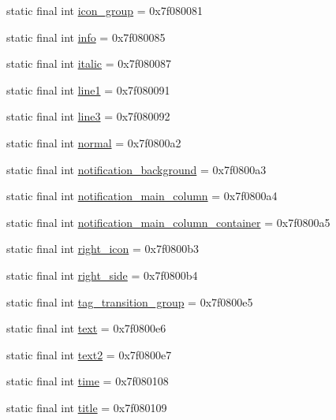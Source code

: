 \begin{DoxyCompactItemize}
\item 
static final int \mbox{\hyperlink{classandroid_1_1support_1_1coreutils_1_1_r_1_1id_a07a2377dc709f9b50bc8a09318b64122}{icon\+\_\+group}} = 0x7f080081
\item 
static final int \mbox{\hyperlink{classandroid_1_1support_1_1coreutils_1_1_r_1_1id_ae996f4622d90132cfe7f3be798020e06}{info}} = 0x7f080085
\item 
static final int \mbox{\hyperlink{classandroid_1_1support_1_1coreutils_1_1_r_1_1id_a539af34a99b5672098858499696f6cb9}{italic}} = 0x7f080087
\item 
static final int \mbox{\hyperlink{classandroid_1_1support_1_1coreutils_1_1_r_1_1id_a0cff5627ffcbf5f76f88226a5fbef890}{line1}} = 0x7f080091
\item 
static final int \mbox{\hyperlink{classandroid_1_1support_1_1coreutils_1_1_r_1_1id_acd696443c38c57bc37e035129bcb26f2}{line3}} = 0x7f080092
\item 
static final int \mbox{\hyperlink{classandroid_1_1support_1_1coreutils_1_1_r_1_1id_ab1d4420202145fcc0e69eceb35444d40}{normal}} = 0x7f0800a2
\item 
static final int \mbox{\hyperlink{classandroid_1_1support_1_1coreutils_1_1_r_1_1id_a3bce5f3ad761b323a2eb99f303396649}{notification\+\_\+background}} = 0x7f0800a3
\item 
static final int \mbox{\hyperlink{classandroid_1_1support_1_1coreutils_1_1_r_1_1id_a4db238dc74de8db9a5f8c2ee83771e07}{notification\+\_\+main\+\_\+column}} = 0x7f0800a4
\item 
static final int \mbox{\hyperlink{classandroid_1_1support_1_1coreutils_1_1_r_1_1id_aa8cbb39f18ff6181e76ad965e4a63d9f}{notification\+\_\+main\+\_\+column\+\_\+container}} = 0x7f0800a5
\item 
static final int \mbox{\hyperlink{classandroid_1_1support_1_1coreutils_1_1_r_1_1id_a43edd588873f2c79d6ee8ef316cd53db}{right\+\_\+icon}} = 0x7f0800b3
\item 
static final int \mbox{\hyperlink{classandroid_1_1support_1_1coreutils_1_1_r_1_1id_acd6e197cd7abce6c450463b7bc7590a3}{right\+\_\+side}} = 0x7f0800b4
\item 
static final int \mbox{\hyperlink{classandroid_1_1support_1_1coreutils_1_1_r_1_1id_ae42f0d34d784745c92a23554fa19e72f}{tag\+\_\+transition\+\_\+group}} = 0x7f0800e5
\item 
static final int \mbox{\hyperlink{classandroid_1_1support_1_1coreutils_1_1_r_1_1id_a289513fceecd902f29ba1bf996c0afc4}{text}} = 0x7f0800e6
\item 
static final int \mbox{\hyperlink{classandroid_1_1support_1_1coreutils_1_1_r_1_1id_aff851fd667140bcd6dd9d893ab62ca1b}{text2}} = 0x7f0800e7
\item 
static final int \mbox{\hyperlink{classandroid_1_1support_1_1coreutils_1_1_r_1_1id_ad7a7e56ee49aaa67d17b3cb87cf684b2}{time}} = 0x7f080108
\item 
static final int \mbox{\hyperlink{classandroid_1_1support_1_1coreutils_1_1_r_1_1id_ab9de2d4e17927fd3cbb3594914b602ea}{title}} = 0x7f080109
\end{DoxyCompactItemize}
